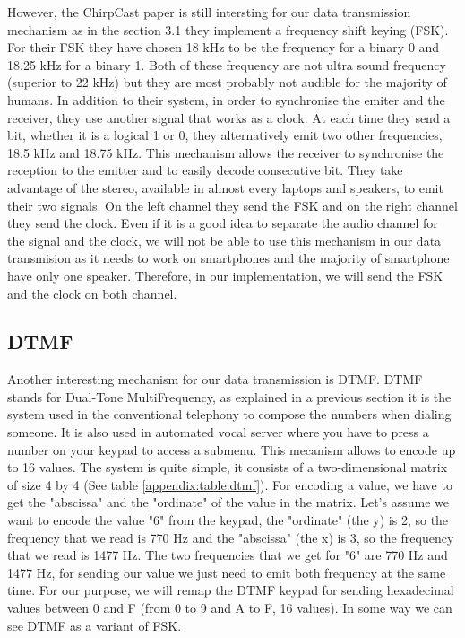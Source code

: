 \documentclass[twocolumn,14pt]{extarticle}
\begin{document}
However, the ChirpCast paper is still intersting for our data transmission mechanism as in the section 3.1 they implement a frequency shift keying (FSK). For their FSK they have chosen 18 kHz to be the frequency for a binary 0 and 18.25 kHz for a binary 1. Both of these frequency are not ultra sound frequency (superior to 22 kHz) but they are most probably not audible for the majority of humans. In addition to their system, in order to synchronise the emiter and the receiver, they use another signal that works as a clock. At each time they send a bit, whether it is a logical 1 or 0, they alternatively emit two other frequencies, 18.5 kHz and 18.75 kHz. This mechanism allows the receiver to synchronise the reception to the emitter and to easily decode consecutive bit. They take advantage of the stereo, available in almost every laptops and speakers, to emit their two signals. On the left channel they send the FSK and on the right channel they send the clock. Even if it is a good idea to separate the audio channel for the signal and the clock, we will not be able to use this mechanism in our data transmision as it needs to work on smartphones and the majority of smartphone have only one speaker. Therefore, in our implementation, we will send the FSK and the clock on both channel.

\subsection{DTMF}
Another interesting mechanism for our data transmission is DTMF. DTMF stands for Dual-Tone MultiFrequency, as explained in a previous section it is the system used in the conventional telephony to compose the numbers when dialing someone. It is also used in automated vocal server where you have to press a number on your keypad to access a submenu. This mecanism allows to encode up to 16 values. The system is quite simple, it consists of a two-dimensional matrix of size 4 by 4 (See table \ref{appendix:table:dtmf}). For encoding a value, we have to get the "abscissa" and the "ordinate" of the value in the matrix. Let's assume we want to encode the value "6" from the keypad, the "ordinate" (the y) is 2, so the frequency that we read is 770 Hz and the "abscissa" (the x) is 3, so the frequency that we read is 1477 Hz. The two frequencies that we get for "6" are 770 Hz and 1477 Hz, for sending our value we just need to emit both frequency at the same time. For our purpose, we will remap the DTMF keypad for sending hexadecimal values between 0 and F (from 0 to 9 and A to F, 16 values). In some way we can see DTMF as a variant of FSK.
\end{document}
